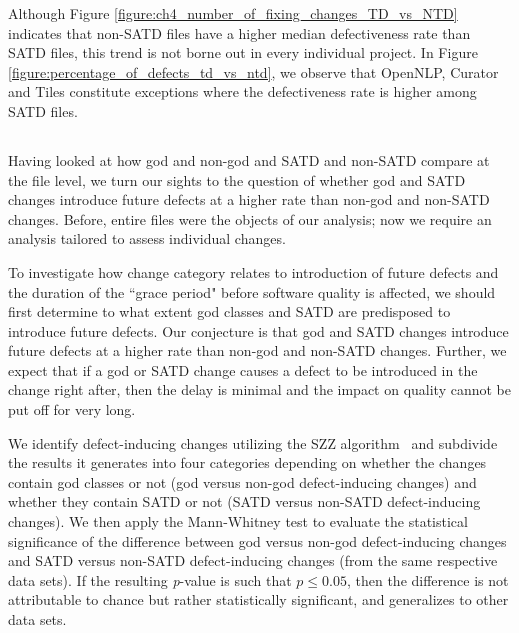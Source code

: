 Although Figure \ref{figure:ch4_number_of_fixing_changes_TD_vs_NTD} indicates that non-SATD files have a higher median defectiveness rate than SATD files, this trend is not borne out in every individual project. In Figure \ref{figure:percentage_of_defects_td_vs_ntd}, we observe that OpenNLP, Curator and Tiles constitute exceptions where the defectiveness rate is higher among SATD files.


\subsection*{\chapterIVrqII}


Having looked at how god and non-god and SATD and non-SATD compare at the file level, we turn our sights to the question of whether god and SATD changes introduce future defects at a higher rate than non-god and non-SATD changes. Before, entire files were the objects of our analysis; now we require an analysis tailored to assess individual changes.


To investigate how change category relates to introduction of future defects and the duration of the ``grace period" before software quality is affected, we should first determine to what extent god classes and SATD are predisposed to introduce future defects. Our conjecture is that god and SATD changes introduce future defects at a higher rate than non-god and non-SATD changes. Further, we expect that if a god or SATD change causes a defect to be introduced in the change right after, then the delay is minimal and the impact on quality cannot be put off for very long.


We identify defect-inducing changes utilizing the SZZ algorithm~\cite{sliwerski-msr-2005} and subdivide the results it generates into four categories depending on whether the changes contain god classes or not (god versus non-god defect-inducing changes) and whether they contain SATD or not (SATD versus non-SATD defect-inducing changes). We then apply the Mann-Whitney test \cite{mann1947test} to evaluate the statistical significance of the difference between god versus non-god defect-inducing changes and SATD versus non-SATD defect-inducing changes (from the same respective data sets). If the resulting \textit{p}-value is such that $p \le 0.05$, then the difference is not attributable to chance but rather statistically significant, and generalizes to other data sets.


